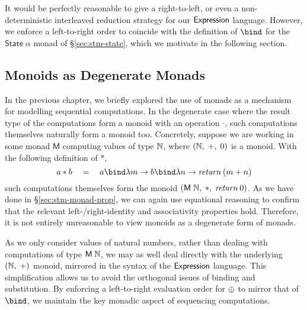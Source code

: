 \noindent It would be perfectly reasonable to give a right-to-left, or even
a non-deterministic interleaved reduction strategy for our $\textsf{Expression}$
language. However, we enforce a left-to-right order to coincide with the
definition of $\bind$ for the $\mathsf{State}\;\alpha$ monad of
\S\ref{sec:stm-state}, which we motivate in the following section.


\subsection{Monoids as Degenerate Monads}\label{sec:semantics-degenerate}%

In the previous chapter, we briefly explored the use of monads as
a mechanism for modelling sequential computations. In the degenerate case
where the result type of the computations form a monoid with an operation
$\cdot$, such computations themselves naturally form a monoid too.
Concretely, suppose we are working in some monad $\mathsf{M}$ computing
values of type $\mathbb{N}$, where $(\mathbb{N},\;+,\;0)$ is a monoid. With the
following definition of $\ast$,
\[
	a \ast b \quad=\quad
		a \bind \lambda m \rightarrow
		b \bind \lambda n \rightarrow
		\textit{return}\;(m + n)
\]
such computations themselves form the monoid
$(\mathsf{M}\;\mathbb{N},\;\ast,\;\textit{return}\;0)$. As we have done in
\S\ref{sec:stm-monad-prop}, we can again use equational reasoning to confirm
that the relevant left-/right-identity and associativity properties hold.
Therefore, it is not entirely unreasonable to view monoids as a degenerate
form of monads.

As we only consider values of natural numbers, rather than dealing with
computations of type $\mathsf{M}\;\mathbb{N}$, we may as well deal directly with
the underlying $(\mathbb{N},\;+)$ monoid, mirrored in the syntax of the
$\textsf{Expression}$ language. This simplification allows us to avoid the
orthogonal issues of binding and substitution. By enforcing a left-to-right
evaluation order for $\oplus$ to mirror that of $\bind$, we maintain the key
monadic aspect of sequencing computations.


